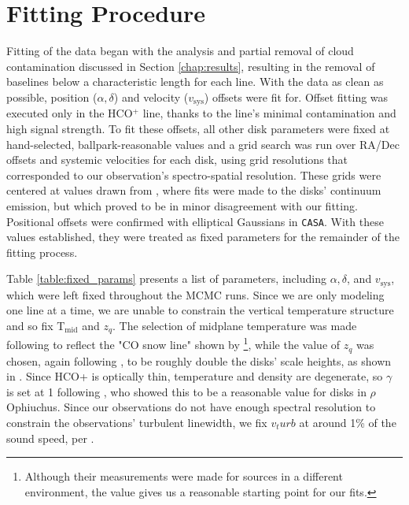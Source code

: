 \section{Fitting Procedure}
\label{section:fitting_procedure}

Fitting of the data began with the analysis and partial removal of cloud contamination discussed in Section \ref{chap:results}, resulting in the removal of baselines below a characteristic length for each line. With the data as clean as possible, position ($\alpha, \delta$) and velocity ($v_\text{sys}$) offsets were fit for. Offset fitting was executed only in the HCO$^+$ line, thanks to the line's minimal contamination and high signal strength. To fit these offsets, all other disk parameters were fixed at hand-selected, ballpark-reasonable values and a grid search was run over RA/Dec offsets and systemic velocities for each disk, using grid resolutions that corresponded to our observation's spectro-spatial resolution. These grids were centered at values drawn from \cite{Williams2014}, where fits were made to the disks' continuum emission, but which proved to be in minor disagreement with our fitting. Positional offsets were confirmed with elliptical Gaussians in \texttt{CASA}. With these values established, they were treated as fixed parameters for the remainder of the fitting process.


Table \ref{table:fixed_params} presents a list of parameters, including $\alpha, \delta$, and $v_\text{sys}$, which were left fixed throughout the MCMC runs. Since we are only modeling one line at a time, we are unable to constrain the vertical temperature structure and so fix T$_\text{mid}$ and $z_q$. The selection of midplane temperature was made following \citet{Factor2017} to reflect the "CO snow line" shown by \citet{Qi2011}\footnote{Although their measurements were made for sources in a different environment, the value gives us a reasonable starting point for our fits.}, while the value of $z_q$ was chosen, again following \citet{Factor2017}, to be roughly double the disks' scale heights, as shown in \citet{Rosenfeld2013}. Since HCO+ is optically thin, temperature and density are degenerate, so $\gamma$ is set at 1 following \cite{Andrews2009}, who showed this to be a reasonable value for disks in $\rho$ Ophiuchus. Since our observations do not have enough spectral resolution to constrain the observations' turbulent linewidth, we fix $v_turb$ at around 1\% of the sound speed, per \citet{Williams2014}.


